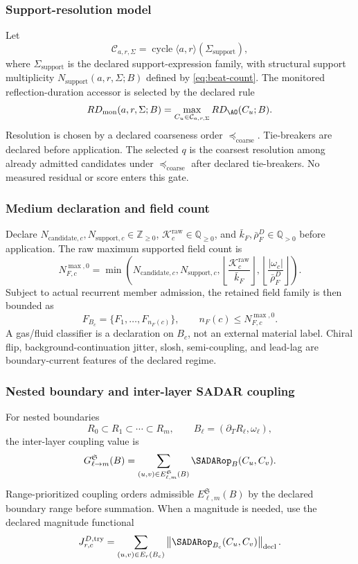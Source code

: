 \subsubsection{Support-resolution model}
\label{subsec:cycle-beat-resolution-gate}
Let
\[
\mathcal C_{a,r,\Sigma}
=
\operatorname{cycle}\langle a,r\rangle(\Sigma_{\mathrm{support}}),
\]
where \(\Sigma_{\mathrm{support}}\) is the declared support-expression family,
with structural support multiplicity \(N_{\mathrm{support}}(a,r,\Sigma;B)\)
defined by \eqref{eq:beat-count}.
The monitored reflection-duration accessor is selected by the declared rule
\[
RD_{\mathrm{mon}}(a,r,\Sigma;B)
=
\max_{C_u\in\mathcal C_{a,r,\Sigma}}
RD_{\AO}(C_u;B).
\]
Resolution is chosen by a declared coarseness order \(\preceq_{\mathrm{coarse}}\). Tie-breakers are declared before application. The selected \(q\) is the coarsest resolution among already admitted candidates under \(\preceq_{\mathrm{coarse}}\) after declared tie-breakers. No measured residual or score enters this gate.

\subsubsection{Medium declaration and field count}\label{subsec:medium-declaration-field-count}
Declare \(N_{\mathrm{candidate},c},N_{\mathrm{support},c}\in\mathbb Z_{\ge0}\), \(\mathcal K^{\mathrm{raw}}_c\in\mathbb Q_{\ge0}\), and \(\bar k_F,\bar\rho^D_F\in\mathbb Q_{>0}\) before application. The raw maximum supported field count is
\[
N^{\max,0}_{F,c}
=
\min\left(
N_{\mathrm{candidate},c},
N_{\mathrm{support},c},
\left\lfloor\frac{\mathcal K^{\mathrm{raw}}_c}{\bar k_F}\right\rfloor,
\left\lfloor\frac{|\omega_c|}{\bar\rho^D_F}\right\rfloor
\right).
\]
Subject to actual recurrent member admission, the retained field family is then bounded as
\[
F_{B_c}=\{F_1,\ldots,F_{n_F(c)}\},
\qquad
n_F(c)\le N^{\max,0}_{F,c}.
\]
A gas/fluid classifier is a declaration on \(B_c\), not an external material label. Chiral flip, background-continuation jitter, slosh, semi-coupling, and lead-lag are boundary-current features of the declared regime.



\subsubsection{Nested boundary and inter-layer SADAR coupling}\label{subsec:interlayer-sadar-coupling}
For nested boundaries
\[
R_0\subset R_1\subset\cdots\subset R_m,
\qquad
B_\ell=(\partial_T R_\ell,\omega_\ell),
\]
the inter-layer coupling value is
\[
G^{\mathfrak S}_{\ell\to m}(B)
=
\sum_{(u,v)\in E^{\mathfrak S}_{\ell,m}(B)}
\SADARop_B(C_u,C_v).
\]
Range-prioritized coupling orders admissible \(E^{\mathfrak S}_{\ell,m}(B)\) by the declared boundary range before summation. When a magnitude is needed, use the declared magnitude functional
\[
J^{D,\mathrm{try}}_{r,c}
=
\sum_{(u,v)\in E_r(B_c)}
\left\|\SADARop_{B_c}(C_u,C_v)\right\|_{\mathrm{decl}}.
\]

